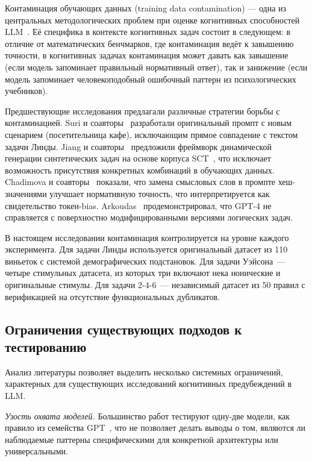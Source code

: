 Контаминация обучающих данных (training data contamination) --- одна из центральных методологических проблем при оценке когнитивных способностей LLM~\cite{zhou2023benchmark}. Её специфика в контексте когнитивных задач состоит в следующем: в отличие от математических бенчмарков, где контаминация ведёт к завышению точности, в когнитивных задачах контаминация может давать как завышение (если модель запоминает правильный нормативный ответ), так и занижение (если модель запоминает человекоподобный ошибочный паттерн из психологических учебников).

Предшествующие исследования предлагали различные стратегии борьбы с контаминацией. Suri и соавторы~\cite{suri2024large} разработали оригинальный промпт с новым сценарием (посетительница кафе), исключающим прямое совпадение с текстом задачи Линды. Jiang и соавторы~\cite{jiang2024peek} предложили фреймворк динамической генерации синтетических задач на основе корпуса SCT~\cite{mostafazadeh2016corpus}, что исключает возможность присутствия конкретных комбинаций в обучающих данных. Chadimova и соавторы~\cite{chadimova2024meaningless} показали, что замена смысловых слов в промпте хеш-значениями улучшает нормативную точность, что интерпретируется как свидетельство токен-bias. Arkoudas~\cite{arkoudas2023gpt4} продемонстрировал, что GPT-4 не справляется с поверхностно модифицированными версиями логических задач.

В настоящем исследовании контаминация контролируется на уровне каждого эксперимента. Для задачи Линды используется оригинальный датасет из 110 виньеток с системой демографических подстановок. Для задачи Уэйсона~--- четыре стимульных датасета, из которых три включают нека нонические и оригинальные стимулы. Для задачи 2-4-6~--- независимый датасет из 50 правил с верификацией на отсутствие функциональных дубликатов.

\subsection{Ограничения существующих подходов к тестированию}

Анализ литературы позволяет выделить несколько системных ограничений, характерных для существующих исследований когнитивных предубеждений в LLM.

\textit{Узость охвата моделей.} Большинство работ тестируют одну-две модели, как правило из семейства GPT~\cite{binz2023using, suri2024large}, что не позволяет делать выводы о том, являются ли наблюдаемые паттерны специфическими для конкретной архитектуры или универсальными.

